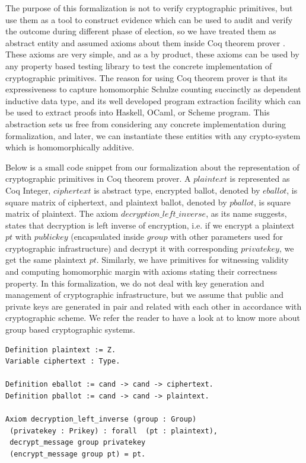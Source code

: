 \documentclass{llncs}
\begin{document}
The purpose of this formalization is not to verify cryptographic primitives, 
but use them as a tool to construct evidence which can be used 
to audit and verify the outcome during different phase 
of election, so we have treated them as abstract entity and assumed 
axioms about them inside Coq theorem prover \cite{Bertot:2004:ITP}.
These axioms are very simple, and as a by product, these axioms can 
be used by any property based testing library to test the concrete
implementation of cryptographic primitives. The reason for using Coq 
theorem prover is that its expressiveness to capture homomorphic 
Schulze counting succinctly as dependent inductive data type, and 
its well developed program extraction \cite{Letouzey:2003:NEC} facility 
which can be used to extract proofs into Haskell, OCaml, or Scheme program.  
This abstraction sets us free from considering any concrete implementation 
during formalization, and later, we can 
instantiate these entities with any crypto-system which is homomorphically 
additive. 

 Below is a small code snippet from our formalization
about the representation of cryptographic primitives in Coq theorem prover.
A $plaintext$ is represented as Coq Integer, $ciphertext$ is abstract type, 
encrypted ballot, denoted by $eballot$,  is square matrix of ciphertext, and
plaintext ballot, denoted by $pballot$,  is square matrix of plaintext.
The axiom  $decryption\_left\_inverse$, as its name suggests, states 
that decryption  is left inverse of encryption, i.e.  
if we encrypt a plaintext $pt$ with $publickey$ 
(encapsulated inside $group$ with other parameters 
used for cryptographic infrastructure) and decrypt it with corresponding 
$privatekey$, we get the same plaintext $pt$. Similarly, we have 
primitives for witnessing validity and computing homomorphic margin with
axioms stating their correctness property.
In this formalization, we do not deal with key generation and management of
cryptographic infrastructure, but we assume that public and private keys 
are generated 
in pair and related with each other in accordance with cryptographic scheme. 
We refer the reader to have a look at 
to know more about group based cryptographic systems.
   
\begin{lstlisting}[frame=single,basicstyle=\ttfamily\footnotesize]
Definition plaintext := Z.
Variable ciphertext : Type. 

Definition eballot := cand -> cand -> ciphertext.
Definition pballot := cand -> cand -> plaintext.

Axiom decryption_left_inverse (group : Group) 
 (privatekey : Prikey) : forall  (pt : plaintext),
 decrypt_message group privatekey 
 (encrypt_message group pt) = pt.
\end{lstlisting}
\end{document}
